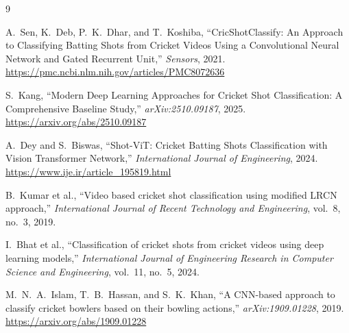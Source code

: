 \documentclass[11pt,a4paper]{article}
\begin{document}
\begin{thebibliography}{9}
\small

A.~Sen, K.~Deb, P.~K.~Dhar, and T.~Koshiba,
``CricShotClassify: An Approach to Classifying Batting Shots from Cricket Videos Using a
Convolutional Neural Network and Gated Recurrent Unit,''
\textit{Sensors}, 2021.
\url{https://pmc.ncbi.nlm.nih.gov/articles/PMC8072636}

S.~Kang,
``Modern Deep Learning Approaches for Cricket Shot Classification: A Comprehensive
Baseline Study,''
\textit{arXiv:2510.09187}, 2025.
\url{https://arxiv.org/abs/2510.09187}

A.~Dey and S.~Biswas,
``Shot-ViT: Cricket Batting Shots Classification with Vision Transformer Network,''
\textit{International Journal of Engineering}, 2024.
\url{https://www.ije.ir/article_195819.html}

B.~Kumar et al.,
``Video based cricket shot classification using modified LRCN approach,''
\textit{International Journal of Recent Technology and Engineering}, vol.~8, no.~3, 2019.

I.~Bhat et al.,
``Classification of cricket shots from cricket videos using deep learning models,''
\textit{International Journal of Engineering Research in Computer Science and
Engineering}, vol.~11, no.~5, 2024.

M.~N.~A.~Islam, T.~B.~Hassan, and S.~K.~Khan,
``A CNN-based approach to classify cricket bowlers based on their bowling actions,''
\textit{arXiv:1909.01228}, 2019.
\url{https://arxiv.org/abs/1909.01228}

\end{thebibliography}
\end{document}
